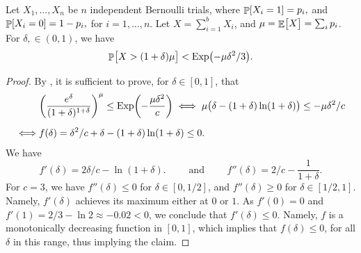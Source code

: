 \begin{fragment}{}
    \begin{lemma}
        Let $X_1, \ldots, X_n$ be $n$ independent Bernoulli trials, where
        \begin{math}
            \Prob{  X_i = 1 } =p_i,
        \end{math}
        and 
        \begin{math}
            \Prob{  X_i = 0 } =1- p_i,
        \end{math}
        for $i=1,\ldots, n$.  Let $X = \sum_{i=1}^{b} X_i$, and
        $\mu = \mathop{\mathbb{E}}\!\left[ {\bigl. X} \right] = \sum_i p_i$.  For $\delta, \in (0,1)$,
        we have
        \begin{equation*}
            \Prob{ \bigl. X > (1+\delta)\mu } < \Exp \pth{-\mu \delta^2 /
               3}.            
        \end{equation*}
    \end{lemma}
\end{fragment}
\begin{proof}
    By , it is sufficient to prove, for
    $\delta\in [0,1]$, that
    \begin{align*}
      & \pth{ \frac{e^\delta}{(1+\delta)^{1+\delta}}}^\mu \leq
        \Exp\pth{- \frac{\mu \delta^2}{c} }
        \iff
        \mu \bigl( \delta -(1+\delta) \ln(1+\delta) \bigr)
        \leq
        - \mu \delta^2/c
      \\[0.2cm]
      \iff
      &
        f(\delta) = \delta^2/c + \delta -(1+\delta) \ln(1+\delta) 
        \leq 0.
    \end{align*}
    We have
    \begin{equation*}
        f'(\delta)
        = 2\delta/c  - \ln(1+\delta).
        \qquad\text{ and }\qquad%
        f''(\delta)
        = 2/c   - \frac{1}{1+\delta}.
    \end{equation*}
    For $c=3$, we have $f''(\delta) \leq 0$ for $\delta \in [0,1/2]$,
    and $f''(\delta) \geq 0$ for $\delta \in [1/2,1]$. Namely,
    $f'(\delta)$ achieves its maximum either at $0$ or $1$. As
    $f'(0) = 0$ and $f'(1) = 2/3 - \ln 2 \approx -0.02<0$, we conclude
    that $f'(\delta) \leq 0$. Namely, $f$ is a monotonically
    decreasing function in $[0,1]$, which implies that
    $f(\delta) \leq 0$, for all $\delta$ in this range, thus implying
    the claim.
\end{proof}



